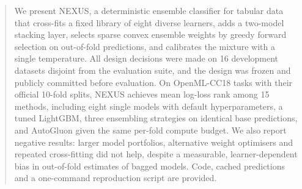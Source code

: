 \begin{abstract}
We present NEXUS, a deterministic ensemble classifier for tabular data that
cross-fits a fixed library of eight diverse learners, adds a two-model stacking
layer, selects sparse convex ensemble weights by greedy forward selection on
out-of-fold predictions, and calibrates the mixture with a single temperature.
All design decisions were made on 16 development datasets disjoint from the
evaluation suite, and the design was frozen and publicly committed before
evaluation. On \NTasks{} OpenML-CC18 tasks
with their official 10-fold splits, NEXUS achieves mean log-loss rank
\NexusRankLogloss{} among 15 methods, including eight single models with default
hyperparameters, a tuned LightGBM, three ensembling strategies on identical base
predictions, and AutoGluon given the same per-fold compute budget.
We also report negative results: larger model portfolios, alternative weight
optimisers and repeated cross-fitting did not help, despite a measurable,
learner-dependent bias in out-of-fold estimates of bagged models. Code, cached
predictions and a one-command reproduction script are provided.
\end{abstract}
